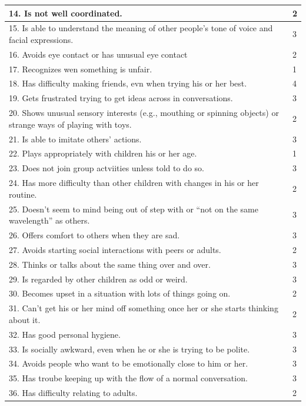 \documentclass{ut-thesis}
\begin{document}
\begin{appendices}
\begin{longtable}{ | p{13cm} | l | }
	14. Is not well coordinated.	&	2	\\	\hline
	15. Is able to understand the meaning of other people's tone of voice and facial expressions.	&	3	\\	\hline
	16. Avoids eye contact or has unusual eye contact	&	2	\\	\hline
	17. Recognizes wen something is unfair.	&	1	\\	\hline
	18. Has difficulty making friends, evn when trying his or her best.	&	4	\\	\hline
	19. Gets frustrated trying to get ideas across in conversations.	&	3	\\	\hline
	20. Shows unusual sensory interests (e.g., mouthing or spinning objects) or strange ways of playing with toys.	&	2	\\	\hline
	21. Is able to imitate others' actions.	&	3	\\	\hline
	22. Plays appropriately with children his or her age.	&	1	\\	\hline
	23. Does not join group actviities unless told to do so.	&	3	\\	\hline
	24. Has more difficulty than other children with changes in his or her routine.	&	2	\\	\hline
	25. Doesn't seem to mind being out of step with or ``not on the same wavelength'' as others.	&	3	\\	\hline
	26. Offers comfort to others when they are sad.	&	3	\\	\hline
	27. Avoids starting social interactions with peers or adults.	&	2	\\	\hline
	28. Thinks or talks about the same thing over and over.	&	3	\\	\hline
	29. Is regarded by other children as odd or weird.	&	3	\\	\hline
	30. Becomes upset in a situation with lots of things going on.	&	2	\\	\hline
	31. Can't get his or her mind off something once her or she starts thinking about it.	&	2	\\	\hline
	32. Has good personal hygiene.	&	3	\\	\hline
	33. Is socially awkward, even when he or she is trying to be polite.	&	3	\\	\hline
	34. Avoids people who want to be emotionally close to him or her.	&	3	\\	\hline
	35. Has troube keeping up with the flow of a normal conversation.	&	3	\\	\hline
	36. Has difficulty relating to adults.	&	2	\\	\hline

\end{longtable}
\end{appendices}
\end{document}
